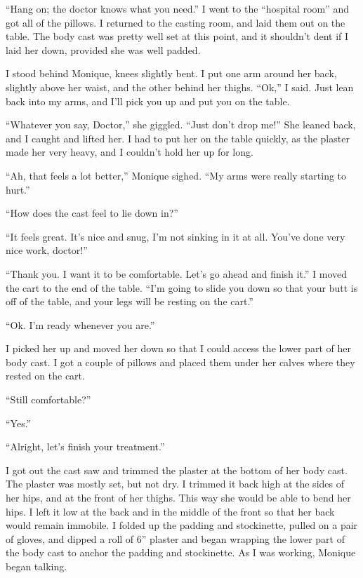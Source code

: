 ``Hang on; the doctor knows what you need.'' I went to the ``hospital room'' and got all of the
pillows. I returned to the casting room, and laid them out on the table. The body cast was
pretty well set at this point, and it shouldn't dent if I laid her down, provided she was well
padded.

I stood behind Monique, knees slightly bent. I put one arm around her back, slightly above
her waist, and the other behind her thighs. ``Ok,'' I said. Just lean back into my arms, and
I'll
pick you up and put you on the table.

``Whatever you say, Doctor,'' she giggled. ``Just don't drop me!'' She leaned back, and I caught
and lifted her. I had to put her on the table quickly, as the plaster made her very heavy, and I
couldn't hold her up for long.

``Ah, that feels a lot better,'' Monique sighed. ``My arms were really starting to hurt.''

``How does the cast feel to lie down in?''

``It feels great. It's nice and snug, I'm not sinking in it at all. You've done very nice
work, doctor!''

``Thank you. I want it to be comfortable. Let's go ahead and finish it.'' I moved the cart to
the end of the table. ``I'm going to slide you down so that your butt is off of the table, and
your legs will be resting on the cart.''

``Ok. I'm ready whenever you are.''

I picked her up and moved her down so that I could access the lower part of her body cast.
I got a couple of pillows and placed them under her calves where they rested on the cart.

``Still comfortable?''

``Yes.''

``Alright, let's finish your treatment.''

I got out the cast saw and trimmed the plaster at the bottom of her body cast. The plaster
was mostly set, but not dry. I trimmed it back high at the sides of her hips, and at the front
of her thighs. This way she would be able to bend her hips. I left it low at the back and in the
middle of the front so that her back would remain immobile. I folded up the padding and
stockinette, pulled on a pair of gloves, and dipped a roll of 6'' plaster and began wrapping the
lower part of the body cast to anchor the padding and stockinette. As I was working, Monique
began talking.

